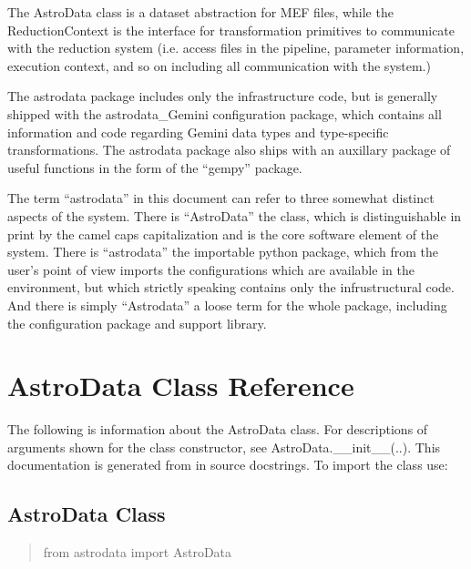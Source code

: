 \documentclass[letterpaper,10pt,english]{sphinxmanual}
\begin{document}
The AstroData class is a dataset abstraction for MEF files, while the
ReductionContext is the interface for transformation primitives to
communicate with the reduction system (i.e. access files in the
pipeline, parameter information, execution context, and so on
including all communication with the system.)

The astrodata package includes only the infrastructure code, but is
generally shipped with the astrodata\_Gemini configuration package,
which contains all information and code regarding Gemini data types
and type-specific transformations. The astrodata package also ships
with an auxillary package of useful functions in the form of the
``gempy'' package.

The term ``astrodata'' in this document can refer to three somewhat
distinct aspects of the system. There is ``AstroData'' the class, which
is distinguishable in print by the camel caps capitalization and is
the core software element of the system. There is ``astrodata'' the
importable python package, which from the user's point of view imports
the configurations which are available in the environment, but which
strictly speaking contains only the infrustructural code. And there is
simply ``Astrodata'' a loose term for the whole package, including the
configuration package and support library.


\chapter{AstroData Class Reference}
\label{chapter_AstroDataClass:astrodata-class-reference}\label{chapter_AstroDataClass::doc}
The following is information about the AstroData class. For descriptions of
arguments shown for the class constructor, see AstroData.\_\_init\_\_(..).  This
documentation is generated from in source docstrings. To import the
 class use:


\section{AstroData Class}
\label{chapter_AstroDataClass:astrodata-class}\begin{quote}

from astrodata import AstroData
\end{quote}

\end{document}
